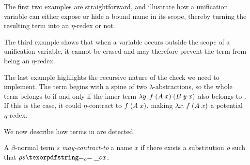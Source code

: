 The first two examples are straightforward, and illustrate how a
unification variable can either expose or hide a bound name in its scope,
thereby turning the resulting term into an $\eta$-redex or not.

The third example shows that when a variable occurs outside the scope
of a unification variable, it cannot be erased and may therefore prevent
the term from being an $\eta$-redex.

The last example highlights the recursive nature of the check we need
to implement. The term begins with a spine of two $\lambda$-abstractions,
so the whole term belongs to \maybeeta if and only if the inner term
$\lambda y.\, f \appsep (A \appsep x) \appsep (B \appsep y \appsep x)$
also belongs to \maybeeta. If this is the case, it could
$\eta$-contract to $f \appsep (A \appsep x)$, making
$\lambda x.\, f \appsep (A \appsep x)$ a potential $\eta$-redex.

We now describe how terms in \maybeeta are detected.
\newcommand{\reduceto}{\emph{may-contract-to}}
\begin{definition}[\reduceto]\label{def:may-contract-to}
  A $\beta$-normal term $s$ \reduceto{} a name $x$ if there exists a
  substitution $\rho$ such that $\rho s \Eo{} x$.
\end{definition}

